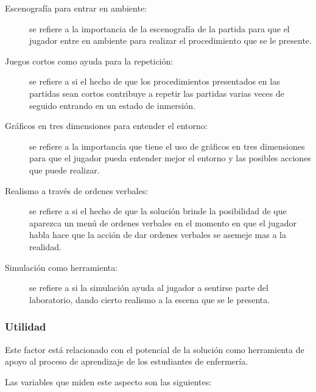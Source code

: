 \begin{description}

\item[Escenografía para entrar en ambiente:] se refiere a la importancia de la
    escenografía de la partida para que el jugador entre en ambiente para
    realizar el procedimiento que se le presente.

\item[Juegos cortos como ayuda para la repetición:] se refiere a si el hecho de
    que los procedimientos presentados en las partidas sean cortos contribuye a
    repetir las partidas varias veces de seguido entrando en un estado de
    inmersión.

\item[Gráficos en tres dimensiones para entender el entorno:] se refiere a la
    importancia que tiene el uso de gráficos en tres dimensiones para que el
    jugador pueda entender mejor el entorno y las posibles acciones que puede
    realizar.

\item[Realismo a través de ordenes verbales:] se refiere a si el hecho de que la
    solución brinde la posibilidad de que aparezca un menú de ordenes verbales
    en el momento en que el jugador habla hace que la acción de dar ordenes
    verbales se asemeje mas a la realidad.

\item[Simulación como herramienta:] se refiere a si la simulación ayuda al
    jugador a sentirse parte del laboratorio, dando cierto realismo a la escena
    que se le presenta.

\end{description}

\subsubsection{Utilidad}
\label{sec:sub_utilidad}

Este factor está relacionado con el potencial de la solución como herramienta 
de apoyo al proceso de aprendizaje de los estudiantes de enfermería.

Las variables que miden este aspecto son las siguientes: 


